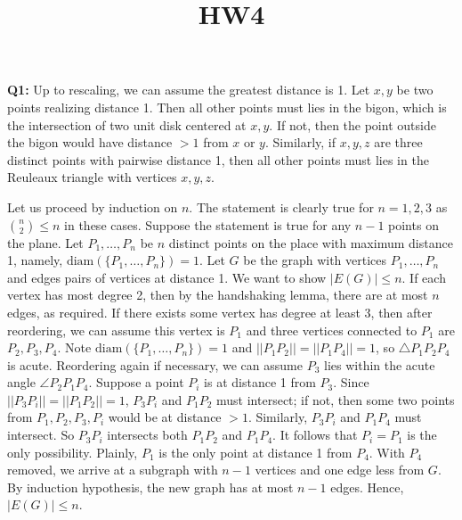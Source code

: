 \documentclass[12pt,reqno]{amsart}
\theoremstyle{definition}
\newcommand{\diam}[1]{\mathrm{diam}(#1)}
\begin{document}
\title{HW4}

\noindent \textbf{Q1:} Up to rescaling, we can assume the greatest distance is 1. Let $x,y$ be two points realizing distance 1. Then all other points must lies in the bigon, which is the intersection of two unit disk centered at $x,y$. If not, then the point outside the bigon would have distance $>1$ from $x$ or $y$. Similarly,  if $x,y,z$ are three distinct points with pairwise distance 1, then all other points must lies in the Reuleaux triangle with vertices $x,y,z$.

\begin{center}
\end{center}


Let us proceed by induction on $n$. The statement is clearly true for $n=1,2,3$ as $\binom{n}{2}\leq n$ in these cases. Suppose the statement is true for any $n-1$ points on the plane. Let $P_1,\dots, P_n$ be $n$ distinct points on the place with maximum distance 1, namely,  $\diam{\{P_1,\dots,P_n\}}=1$. Let $G$ be the graph with vertices  $P_1,\dots, P_n$ and  edges  pairs of vertices at distance 1. We want to show $|E(G)|\leq n$. If each vertex has most degree 2, then by the handshaking lemma, there are at most $n$ edges, as required. If there exists some vertex has degree at least 3, then after reordering, we can assume this vertex is $P_1$ and three vertices connected to $P_1$ are $P_2,P_3,P_4$. Note $\diam{\{P_1,\dots,P_n\}}=1$ and $||P_1P_2||=||P_1P_4||=1$, so $\triangle P_1P_2P_4$ is acute. Reordering again if necessary, we can assume $P_3$ lies within the acute angle  $\angle P_2P_1P_4$. Suppose a point $P_i$ is at distance 1 from $P_3$. Since $||P_3P_i||=||P_1P_2||=1$, $P_3P_i$ and $P_1P_2$ must intersect; if not, then some two points from $P_1,P_2,P_3,P_i$ would be at distance $>1$. Similarly, $P_3P_i$ and $P_1P_4$ must intersect. So $P_3P_i$ intersects both $P_1P_2$ and $P_1P_4$. It follows that $P_i=P_1$ is the only possibility. Plainly, $P_1$ is the only point at distance 1 from $P_4$. With $P_4$ removed, we arrive at a subgraph with $n-1$ vertices and one edge less from $G$. By induction hypothesis, the new graph has at most $n-1$ edges. Hence, $|E(G)|\leq n$.
\end{document}
